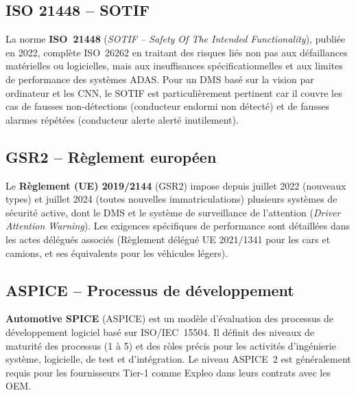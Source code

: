 \documentclass[12pt,a4paper]{report}
\begin{document}
\subsection{ISO 21448 -- SOTIF}

La norme \textbf{ISO~21448} (\textit{SOTIF -- Safety Of The Intended Functionality}), publi\'ee en 2022, compl\`ete ISO~26262 en traitant des risques li\'es non pas aux d\'efaillances mat\'erielles ou logicielles, mais aux insuffisances sp\'ecificationnelles et aux limites de performance des syst\`emes ADAS. Pour un DMS bas\'e sur la vision par ordinateur et les CNN, le SOTIF est particuli\`erement pertinent car il couvre les cas de fausses non-d\'etections (conducteur endormi non d\'etect\'e) et de fausses alarmes r\'ep\'et\'ees (conducteur alerte alert\'e inutilement).

\subsection{GSR2 -- R\`eglement europ\'een}

Le \textbf{R\`eglement (UE) 2019/2144} (GSR2) impose depuis juillet 2022 (nouveaux types) et juillet 2024 (toutes nouvelles immatriculations) plusieurs syst\`emes de s\'ecurit\'e active, dont le DMS et le syst\`eme de surveillance de l'attention (\textit{Driver Attention Warning}). Les exigences sp\'ecifiques de performance sont d\'etaill\'ees dans les actes d\'el\'egu\'es associ\'es (R\`eglement d\'el\'egu\'e UE 2021/1341 pour les cars et camions, et ses \'equivalents pour les v\'ehicules l\'egers).

\subsection{ASPICE -- Processus de d\'eveloppement}

\textbf{Automotive SPICE} (ASPICE) est un mod\`ele d'\'evaluation des processus de d\'eveloppement logiciel bas\'e sur ISO/IEC~15504. Il d\'efinit des niveaux de maturit\'e des processus (1 \`a 5) et des r\`oles pr\'ecis pour les activit\'es d'ing\'enierie syst\`eme, logicielle, de test et d'int\'egration. Le niveau ASPICE~2 est g\'en\'eralement requis pour les fournisseurs Tier-1 comme Expleo dans leurs contrats avec les OEM.
\end{document}

